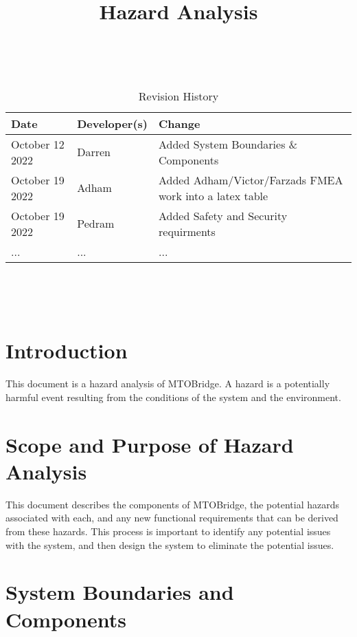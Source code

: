 \documentclass{article}
\title{Hazard Analysis\\\progname}
\author{\authname}
\date{}
\begin{document}
\maketitle
\thispagestyle{empty}

~\newpage


\begin{table}[hp]
\caption{Revision History} \label{TblRevisionHistory}
\begin{tabularx}{\textwidth}{llX}
\toprule
\textbf{Date} & \textbf{Developer(s)} & \textbf{Change}\\
\midrule
October 12 2022 & Darren & Added System Boundaries \& Components\\
October 19 2022& Adham & Added Adham/Victor/Farzads FMEA work into a latex table\\
October 19 2022& Pedram & Added Safety and Security requirments\\
... & ... & ...\\
\bottomrule
\end{tabularx}
\end{table}

~\newpage

\tableofcontents

~\newpage



\section{Introduction}

This document is a hazard analysis of MTOBridge. A hazard is a potentially harmful event resulting
from the conditions of the system and the environment.

\section{Scope and Purpose of Hazard Analysis}

This document describes the components of MTOBridge, the potential hazards associated with each, and 
any new functional requirements that can be derived from these hazards. This process is important to 
identify any potential issues with the system, and then design the system to eliminate the potential issues.

\section{System Boundaries and Components}
\end{document}

